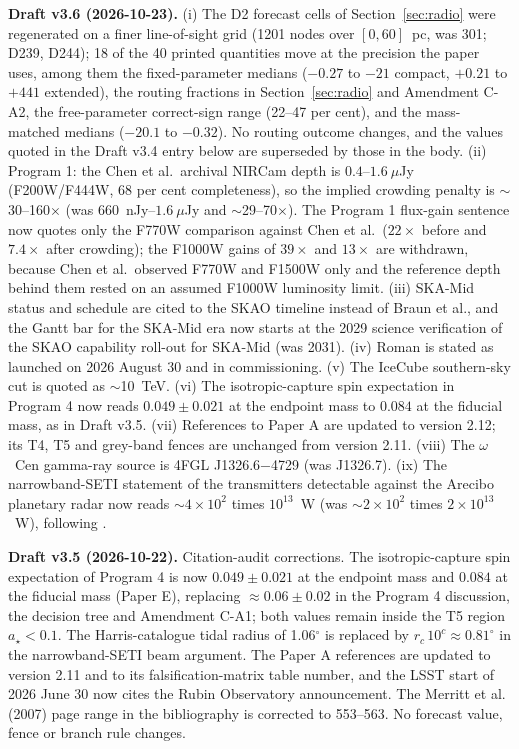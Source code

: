 \documentclass[11pt]{article}
\newcommand{\astar}{\ensuremath{a_\star}}
\newcommand{\ocen}{\ensuremath{\omega}~Cen}
\begin{document}
\textbf{Draft v3.6 (2026-10-23).} (i) The D2 forecast cells of Section~\ref{sec:radio} were regenerated on a finer line-of-sight grid (1201 nodes over $[0, 60]$~pc, was 301; D239, D244); 18 of the 40 printed quantities move at the precision the paper uses, among them the fixed-parameter medians ($-0.27$ to $-21$ compact, $+0.21$ to $+441$ extended), the routing fractions in Section~\ref{sec:radio} and Amendment C-A2, the free-parameter correct-sign range (22--47 per cent), and the mass-matched medians ($-20.1$ to $-0.32$). No routing outcome changes, and the values quoted in the Draft v3.4 entry below are superseded by those in the body. (ii) Program 1: the Chen et al.\ archival NIRCam depth is $0.4$--$1.6~\mu$Jy (F200W/F444W, 68 per cent completeness), so the implied crowding penalty is $\sim$30--160$\times$ (was $660$~nJy--$1.6~\mu$Jy and $\sim$29--70$\times$). The Program 1 flux-gain sentence now quotes only the F770W comparison against Chen et al.\ ($22\times$ before and $7.4\times$ after crowding); the F1000W gains of $39\times$ and $13\times$ are withdrawn, because Chen et al.\ observed F770W and F1500W only and the reference depth behind them rested on an assumed F1000W luminosity limit. (iii) SKA-Mid status and schedule are cited to the SKAO timeline instead of Braun et al., and the Gantt bar for the SKA-Mid era now starts at the 2029 science verification of the SKAO capability roll-out for SKA-Mid (was 2031). (iv) Roman is stated as launched on 2026 August 30 and in commissioning. (v) The IceCube southern-sky cut is quoted as $\sim$10~TeV. (vi) The isotropic-capture spin expectation in Program 4 now reads $0.049\pm0.021$ at the endpoint mass to $0.084$ at the fiducial mass, as in Draft v3.5. (vii) References to Paper A are updated to version 2.12; its T4, T5 and grey-band fences are unchanged from version 2.11. (viii) The \ocen{} gamma-ray source is 4FGL J1326.6$-$4729 (was J1326.7). (ix) The narrowband-SETI statement of the transmitters detectable against the Arecibo planetary radar now reads $\sim 4\times10^{2}$ times $10^{13}$~W (was $\sim 2\times10^{2}$ times $2\times10^{13}$~W), following \citet{Enriquez2017}.

\textbf{Draft v3.5 (2026-10-22).} Citation-audit corrections. The isotropic-capture spin expectation of Program 4 is now $0.049\pm0.021$ at the endpoint mass and $0.084$ at the fiducial mass (Paper E), replacing $\approx0.06\pm0.02$ in the Program 4 discussion, the decision tree and Amendment C-A1; both values remain inside the T5 region $\astar<0.1$. The Harris-catalogue tidal radius of 1.06$^{\circ}$ is replaced by $r_c\,10^{c}\approx0.81^{\circ}$ in the narrowband-SETI beam argument. The Paper A references are updated to version 2.11 and to its falsification-matrix table number, and the LSST start of 2026 June 30 now cites the Rubin Observatory announcement. The Merritt et al. (2007) page range in the bibliography is corrected to 553--563. No forecast value, fence or branch rule changes.
\end{document}
